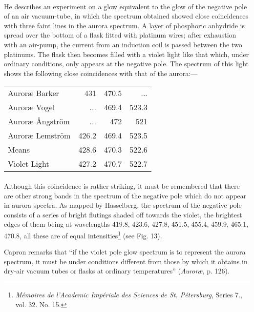 \documentclass[a4paper, 12pt, oneside, polutonikogreek, english]{article}
\begin{document}
\paragraph{}
He describes an experiment on a glow equivalent to the glow of the negative pole of an air vacuum-tube, in which the spectrum obtained showed close coincidences with three faint lines in the aurora spectrum. A layer of phosphoric anhydride is spread over the bottom of a flask fitted with platinum wires; after exhaustion with an air-pump, the current from an induction coil is passed between the two platinums. The flask then becomes filled with a violet light like that which, under ordinary conditions, only appears at the negative pole. The spectrum of this light shows the following close coincidences with that of the aurora:---
\begin{table}[H]
    \centering
    \begin{tabular}{l r r r}
        Auroræ Barker & 431 & 470.5 & ...  \\ 
        Auroræ Vogel & ... & 469.4 & 523.3 \\ 
        Auroræ Ångström & ... & 472 & 521 \\ 
        Auroræ Lemström & 426.2 & 469.4 & 523.5 \\ \hline
        Means & 428.6 & 470.3 & 522.6 \\ 
        Violet Light & 427.2 & 470.7 & 522.7 \\ 
    \end{tabular}
\end{table}
\paragraph{}
Although this coincidence is rather striking, it must be remembered that there are other strong bands in the spectrum of the negative pole which do not appear in aurora spectra. As mapped by Hasselberg, the spectrum of the negative pole consists of a series of bright flutings shaded off towards the violet, the brightest edges of them being at wavelengths 419.8, 423.6, 427.8, 451.5, 455.4, 459.9, 465.1, 470.8, all these are of equal intensities\footnote{\emph{Mémoires de l'Academic Impériale des Sciences de St. Pétersburg}, Series 7., vol. 32. No. 15.} (see Fig. 13).

Capron remarks that ``if the violet pole glow spectrum is to represent the aurora spectrum, it must be under conditions different from those by which it obtains in dry-air vacuum tubes or flasks at ordinary temperatures'' (\emph{Auroræ}, p. 126).
\end{document}
